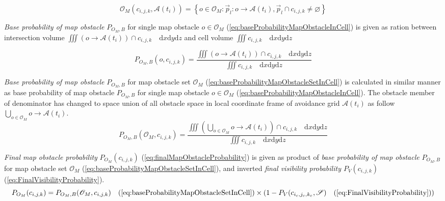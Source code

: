 \begin{equation}\label{eq:obstacleMapCellSapceIntersection}
    \mathscr{O}_M(c_{i,j,k},\mathscr{A}(t_i))=\left\{o\in\mathscr{O}_M:\vec{p}_l:o \to\mathscr{A} (t_i), \vec{p}_l \cap c_{i,j,k} \neq \varnothing \right\}    
\end{equation}

\noindent\emph{Base probability of map obstacle} $P_{O_M,B}$ for single map obstacle $o\in\mathscr{O}_M$ (\ref{eq:baseProbabilityMapObstacleInCell}) is given as ration between intersection volume $\iiint (o\to\mathscr{A}(t_i))\cap c_{i,j,k} \quad \text{d}x\text{d}y\text{d}z$ and cell volume $\iiint c_{i,j,k}\quad\text{d}x\text{d}y\text{d}z$

\begin{equation}\label{eq:baseProbabilityMapObstacleInCell}
    P_{O_M,B}(o,c_{i,j,k}) = \frac{\iiint (o\to\mathscr{A}(t_i))\cap c_{i,j,k} \quad \text{d}x\text{d}y\text{d}z}{\iiint c_{i,j,k}\quad\text{d}x\text{d}y\text{d}z}
\end{equation}

\noindent\emph{Base probability of map obstacle} $P_{O_M,B}$ for map obstacle set  $\mathscr{O}_M$ (\ref{eq:baseProbabilityMapObstacleSetInCell}) is calculated in similar manner as base probability of map obstacle $P_{O_M,B}$ for single map obstacle $o\in\mathscr{O}_M$ (\ref{eq:baseProbabilityMapObstacleInCell}). The obstacle member of denominator has changed to space union of all obstacle space in local coordinate frame of avoidance grid $\mathscr{A}(t_i)$ as follow $\bigcup_{o\in\mathscr{O}_M}o\to\mathscr{A}(t_i)$.
\begin{equation}\label{eq:baseProbabilityMapObstacleSetInCell}
    P_{O_M,B}(\mathscr{O}_M,c_{i,j,k}) = \frac{\iiint \left(\bigcup_{o\in\mathscr{O}_M}o\to\mathscr{A}(t_i)\right) \cap c_{i,j,k} \quad \text{d}x\text{d}y\text{d}z}{\iiint c_{i,j,k}\quad\text{d}x\text{d}y\text{d}z}
\end{equation}

\noindent\emph{Final map obstacle probability} $P_{O_M}(c_{i,j,k})$ (\ref{eq:finalMapObstacleProbability}) is given as product of \emph{base probability of map obstacle} $P_{O_M,B}$ for map obstacle set  $\mathscr{O}_M$ (\ref{eq:baseProbabilityMapObstacleSetInCell}), and inverted \emph{final visibility probability $P_V(c_{i,j,k})$} (\ref{eq:FinalVisibilityProbability}). 
\begin{equation}\label{eq:finalMapObstacleProbability}
    P_{O_M}(c_{i,j,k})=P_{O_M,B}(\mathscr{O}_M,c_{i,j,k})\quad(\ref{eq:baseProbabilityMapObstacleSetInCell})\times\left(1-P_{V}(c_{i_c,j_c,k_c},\mathscr{S})\quad(\ref{eq:FinalVisibilityProbability})\right)
\end{equation}